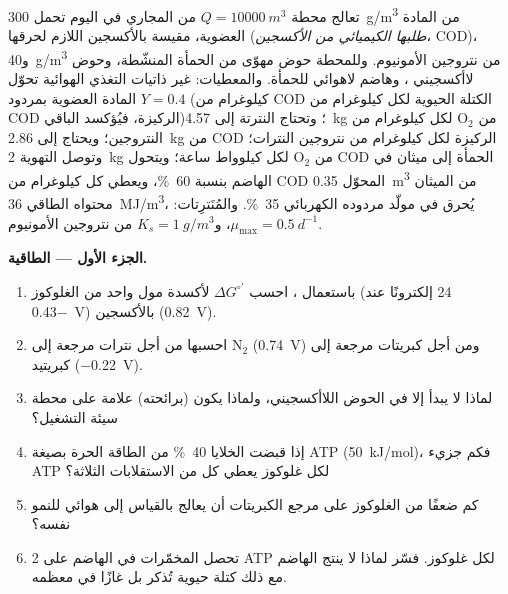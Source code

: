 \begin{problem}
\label{pb:b2:microbial-metabolism:1}
تعالج محطة $Q = \qty{10000}{m^3}$ من المجاري في اليوم تحمل
\qty{300}{g/m^3} من المادة العضوية، مقيسة بالأكسجين اللازم لحرقها
(\emph{طلبها الكيميائي من الأكسجين}، COD)، و\qty{40}{g/m^3} من
نتروجين الأمونيوم. وللمحطة حوض مهوّى من الحمأة المنشّطة، وحوض
لاأكسجيني ، وهاضم لاهوائي للحمأة. والمعطيات: غير ذاتيات
التغذي الهوائية تحوّل المادة العضوية بمردود $Y = 0.4$ (كيلوغرام من
COD الكتلة الحيوية لكل كيلوغرام من COD الركيزة، فيُؤكسد الباقي)؛
وتحتاج النترتة إلى \qty{4.57}{kg} من $\mathrm{O_2}$ لكل كيلوغرام من
النتروجين؛ ويحتاج  إلى \qty{2.86}{kg} من COD الركيزة لكل
كيلوغرام من نتروجين النترات؛ وتوصل التهوية \qty{2}{kg} من
$\mathrm{O_2}$ لكل كيلوواط ساعة؛ ويتحول COD الحمأة إلى ميثان في
الهاضم بنسبة \qty{60}{\%}، ويعطي كل كيلوغرام من COD المحوّل
\qty{0.35}{m^3} من الميثان محتواه الطاقي \qty{36}{MJ/m^3}، يُحرق في
مولّد مردوده الكهربائي \qty{35}{\%}. والمُنَترِتات: $\mu_{\max} = \qty{0.5}{d^{-1}}$، و$K_s =
\qty{1}{g/m^3}$ من نتروجين الأمونيوم.

\medskip
\noindent\textbf{الجزء الأول --- الطاقية.}
\begin{enumerate}
  \item باستعمال ، احسب $\Delta G^{\circ\prime}$
        لأكسدة مول واحد من الغلوكوز (24 إلكترونًا عند
        \qty{-0.43}{V}) بالأكسجين (\qty{+0.82}{V}).
  \item احسبها من أجل نترات مرجعة إلى $\mathrm{N_2}$
        (\qty{+0.74}{V}) ومن أجل كبريتات مرجعة إلى كبريتيد
        (\qty{-0.22}{V}).
  \item لماذا لا يبدأ  إلا في الحوض اللاأكسجيني، ولماذا
        يكون  (برائحته) علامة على محطة سيئة
        التشغيل؟
  \item إذا قبضت الخلايا \qty{40}{\%} من الطاقة الحرة بصيغة ATP
        (\qty{50}{kJ/mol})، فكم جزيء ATP لكل غلوكوز يعطي كل من
        الاستقلابات الثلاثة؟
  \item كم ضعفًا من الغلوكوز على مرجع الكبريتات أن يعالج بالقياس
        إلى هوائي للنمو نفسه؟
  \item تحصل المخمّرات في الهاضم على 2 ATP لكل غلوكوز. فسّر لماذا
        لا ينتج الهاضم مع ذلك كتلة حيوية تُذكر بل غازًا في معظمه.
\end{enumerate}


\end{problem}
